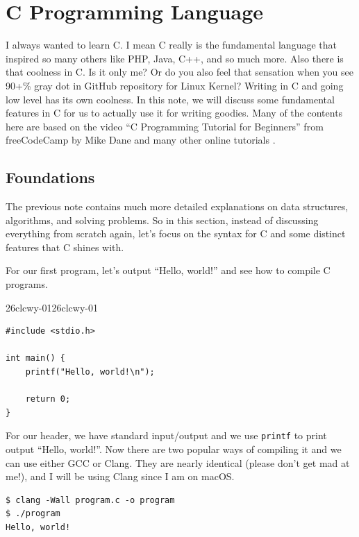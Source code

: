 \documentclass[../../../main.tex]{subfiles}
\begin{document}
\chapter{C Programming Language}

I always wanted to learn C. I mean C really is the fundamental
language that inspired so many others like PHP, Java, C++, and
so much more. Also there is that coolness in C. Is it only me?
Or do you also feel that sensation when you see 90+\% gray dot
in GitHub repository for Linux Kernel? Writing in C and going
low level has its own coolness. In this note, we will discuss some
fundamental features in C for us to actually use it for writing
goodies. Many of the contents here are based on the video
``C Programming Tutorial for Beginners'' from freeCodeCamp by
Mike Dane and many other online tutorials \cite{CS03-1}.

\section{Foundations}

The previous note contains much more detailed explanations on
data structures, algorithms, and solving problems. So in this
section, instead of discussing everything from scratch again,
let's focus on the syntax for C and some distinct features that
C shines with.

For our first program, let's output ``Hello, world!'' and see how
to compile C programs.

\begin{cbox}{26clcwy-01}{26clcwy-01}
\begin{lstlisting}[style=cstyle]
#include <stdio.h>

int main() {
    printf("Hello, world!\n");

    return 0;
}
\end{lstlisting}
\end{cbox}

For our header, we have standard input/output and we use \verb|printf|
to print output ``Hello, world!''. Now there are two popular ways of
compiling it and we can use either GCC or Clang. They are nearly
identical (please don't get mad at me!), and I will be using Clang
since I am on macOS.

\begin{basicbox}
\begin{lstlisting}[style=basic]
$ clang -Wall program.c -o program
$ ./program
Hello, world!
\end{lstlisting}
\end{basicbox}
\end{document}
